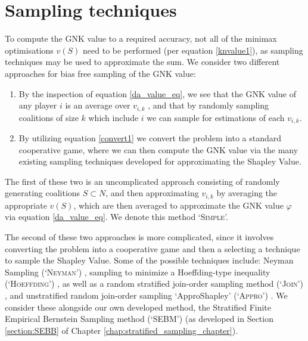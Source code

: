 \section{Sampling techniques}\label{sec:sampling_techniques}
To compute the GNK value to a required accuracy, not all of the minimax optimisations $v(S)$ need to be performed (per equation \ref{knvalue1}), as sampling techniques may be used to approximate the sum.
We consider two different approaches for bias free sampling of the GNK value:
\begin{enumerate}
    \item By the inspection of equation \ref{da_value_eq}, we see that the GNK value of any player $i$ is an average over $v_{i,k}$%
, and that by randomly sampling coalitions of size $k$ which include $i$ we can sample for estimations of each $v_{i,k}$.
    \item By utilizing equation \ref{convert1} we convert the problem into a standard cooperative game, where we can then compute the GNK value via the many existing sampling techniques developed for approximating the Shapley Value.
\end{enumerate}

The first of these two is an uncomplicated approach consisting of randomly generating coalitions $S\subset N$, %
and then approximating $v_{i,k}$ by averaging the appropriate $v(S)$, which are then averaged to approximate the GNK value $\varphi$ via equation \ref{da_value_eq}. We denote this method `\textsc{Simple}'.

The second of these two approaches is more complicated, since it involves converting the problem into a cooperative game and then a selecting a technique to sample the Shapley Value.
Some of the possible techniques include: Neyman Sampling (`\textsc{Neyman}') \citep{CASTRO2017180,1938.10503378}, sampling to minimize a Hoeffding-type inequality (`\textsc{Hoeffding}') \citep{2013arXiv1306.4265M}, as well as a random stratified join-order sampling method (`\textsc{Join}') \citep{CASTRO2017180}, and unstratified random join-order sampling `ApproShapley' (`\textsc{Appro}') \citep{DBLP:journals/cor/CastroGT09}.
We consider these alongside our own developed method, the Stratified Finite Empirical Bernstein Sampling method (`SEBM') (as developed in Section \ref{section:SEBB} of Chapter \ref{chap:stratified_sampling_chapter}).

